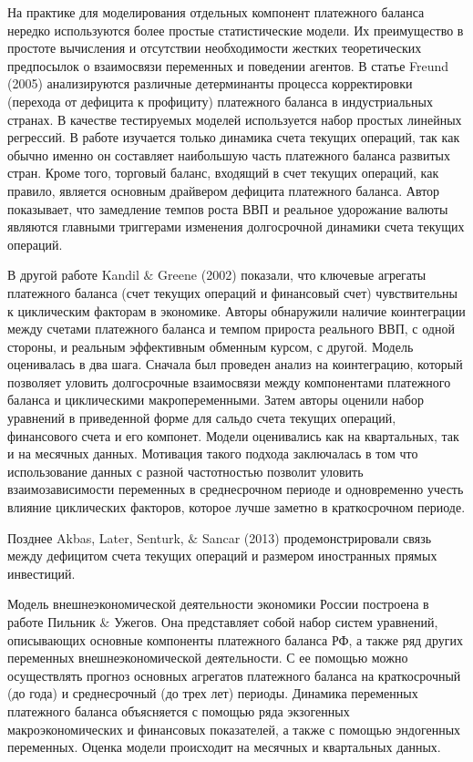 \documentclass[a4paper, 14pt]{extarticle}
\begin{document}
На практике для моделирования отдельных компонент платежного баланса нередко используются более простые статистические модели.
Их преимущество в простоте вычисления и отсутствии необходимости жестких теоретических предпосылок о взаимосвязи переменных и поведении агентов.
В статье Freund (2005) \autocite{freund2005current} анализируются различные детерминанты процесса корректировки (перехода от дефицита к профициту) платежного баланса в индустриальных странах. 
В качестве тестируемых моделей используется набор простых линейных регрессий.
В работе изучается только динамика счета текущих операций, так как обычно именно он составляет наибольшую часть платежного баланса развитых стран. 
Кроме того, торговый баланс, входящий в счет текущих операций, как правило, является основным драйвером дефицита платежного баланса.
Автор показывает, что замедление темпов роста ВВП и реальное удорожание валюты являются главными триггерами изменения долгосрочной динамики счета текущих операций.  

В другой работе Kandil $\&$ Greene (2002) \autocite{kandil2002impact} показали, что ключевые агрегаты платежного баланса (счет текущих операций и финансовый счет) чувствительны к циклическим факторам в экономике. 
Авторы обнаружили наличие коинтеграции между счетами платежного баланса и темпом прироста реального ВВП, с одной стороны, и реальным эффективным обменным курсом, с другой. Модель оценивалась в два шага. 
Сначала был проведен анализ на коинтеграцию, который позволяет уловить долгосрочные взаимосвязи между компонентами платежного баланса и циклическими макропеременными. 
Затем авторы оценили набор уравнений в приведенной форме для сальдо счета текущих операций, финансового счета и его компонет. 
Модели оценивались как на квартальных, так и на месячных данных. 
Мотивация такого подхода заключалась в том что использование данных с разной частотностью позволит уловить взаимозависимости переменных в среднесрочном периоде и одновременно учесть влияние циклических факторов, которое лучше заметно в краткосрочном периоде.

Позднее Akbas, Later, Senturk, $\&$ Sancar  (2013) \autocite{akbas2013testing} продемонстрировали
 связь между дефицитом счета текущих операций и размером иностранных прямых инвестиций.

Модель внешнеэкономической деятельности экономики России построена в работе Пильник $\&$ Ужегов.
Она представляет собой набор систем уравнений, описывающих основные компоненты платежного баланса РФ, а также ряд других переменных внешнеэкономической деятельности.
С ее помощью можно осуществлять прогноз основных агрегатов платежного баланса на краткосрочный (до года) и среднесрочный (до трех лет) периоды.
Динамика переменных платежного баланса объясняется с помощью ряда экзогенных макроэкономических и финансовых показателей, а также с помощью эндогенных переменных. 
Оценка модели происходит на месячных и квартальных данных.
\end{document}
